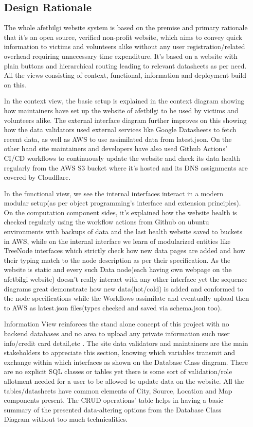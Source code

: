 \subsection{Design Rationale}

The whole afetbilgi website system is based on the premise and primary rationale that it's an open source, verified non-profit website, which aims to convey quick information to victims and volunteers alike without any user registration/related overhead requiring unnecessary time expenditure. It's based on a website with plain buttons and hierarchical routing leading to relevant datasheets as per need. All the views consisting of context, functional, information and deployment build on this.

In the context view, the basic setup is explained in the context diagram showing how maintainers have set up the website of afetbilgi to be used by victims and volunteers alike. The external interface diagram further improves on this showing how the data validators used external services like Google Datasheets to fetch recent data, as well as AWS to use assimilated data from latest.json. On the other hand site maintainers and developers have also used Github Actions' CI/CD workflows to continuously update the website and check its data health regularly from the AWS S3 bucket where it's hosted and its DNS assignments are covered by Cloudflare. 

In the functional view, we see the internal interfaces interact in a modern modular setup(as per object programming's interface and extension principles). On the computation component sides, it's explained how the website health is checked regularly using the workflow actions from Github on ubuntu environments with backups of data and the last health website saved to buckets in AWS, while on the internal interface we learn of modularized entities like TreeNode interfaces which strictly check how new data pages are added and how their typing match to the node description as per their specification. As the website is static and every such Data node(each having own webpage on the afetbilgi website) doesn't really interact with any other interface yet the sequence diagrams great demonstrate how new data(hot/cold) is added and conformed to the node specifications while the Workflows assimilate and eventually upload then to AWS as latest.json files(types checked and saved via schema.json too). 

Information View reinforces the stand alone concept of this project with no backend databases and no area to upload any private information such user info/credit card detail,etc . The site data validators and maintainers  are the main stakeholders to appreciate this section, knowing which variables transmit and exchange within which interfaces as shown on the Database Class diagram. There are no explicit SQL classes or tables yet there is some sort of validation/role allotment needed for a user to be allowed to update data on the website. All the tables/datasheets have common elements of City, Source, Location and Map components present. The CRUD operations' table helps in having a basic summary of the presented data-altering options from the Database Class Diagram without too much technicalities. 

